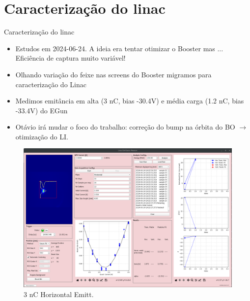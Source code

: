 
\section{Caracterização do linac}



\begin{frame}{Caracterização do linac}

{\footnotesize
\begin{itemize}
    \item Estudos em 2024-06-24. A ideia era tentar otimizar o Booster mas ... Eficiência de captura muito variável!
    \item Olhando variação do feixe nas screens do Booster migramos para caracterização do Linac
    \item Medimos emitância em alta (3 nC, bias -30.4V) e média carga (1.2 nC, bias -33.4V) do EGun
    \item Otávio irá mudar o foco do trabalho: correção do bump na órbita do BO $\rightarrow$ otimização do LI.
\end{itemize}
}
\begin{figure}[ht]
    \begin{minipage}[b]{0.4\linewidth}
        \centering
        \includegraphics[width=\textwidth]{2024-07-12/figures/emitx_meas_bias_m30p4_charge_3p0nc.png}
        \caption{3 nC Horizontal Emitt.}
        \label{fig:a}
    \end{minipage}
    \hspace{0.3cm}
    \begin{minipage}[b]{0.4\linewidth}
        \centering

\end{minipage}
\end{figure}
\end{frame}
